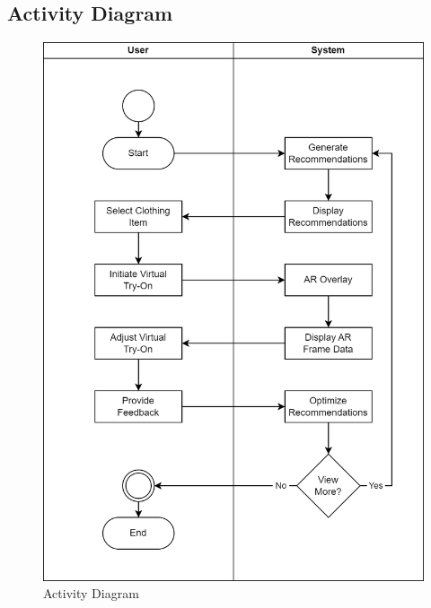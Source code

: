 	\subsection{Activity Diagram}
		\begin{figure}[h!]
			\includegraphics[width=\textwidth]{components/images/activity.png}
			\caption{Activity Diagram}
			\label{fig:activity}
		\end{figure}

	\pagebreak

